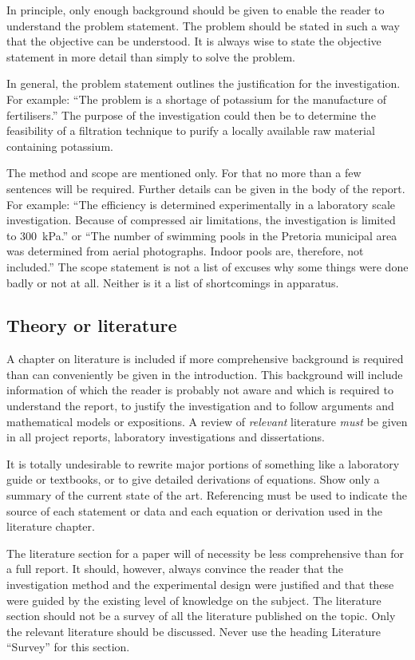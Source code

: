 \documentclass[a5paper, 10pt]{article}
\begin{document}
In principle, only enough background should be given to enable the
reader to understand the problem statement.  The problem should be
stated in such a way that the objective can be understood.
It is always wise to state the objective statement in more detail than simply to solve the problem.

In general, the problem statement outlines the justification for the
investigation.  For example: 
``The problem is a shortage of potassium for the manufacture of fertilisers.'' 
The purpose of the investigation could then be to determine the feasibility of a filtration technique to purify a locally available raw material containing potassium.

The method and scope are mentioned only.  For that no
more than a few sentences will be required.  Further details can be
given in the body of the report.  For example: ``The efficiency is
determined experimentally in a laboratory scale investigation.
Because of compressed air limitations, the investigation is limited to
\SI{300}{\kilo\pascal}.''  or ``The number of swimming pools in the Pretoria
municipal area was determined from aerial photographs.  Indoor pools
are, therefore, not included.''  The scope statement is not a
list of excuses why some things were done badly or not at all. Neither is it a list of shortcomings in apparatus.

\subsection{Theory or literature}
\label{sec:literature}
A chapter on literature is included if more comprehensive background
is required than can conveniently be given in the introduction.  This
background will include information of which the reader is probably
not aware and which is required to understand the report, to justify
the investigation and to follow arguments and mathematical models or
expositions.  A review of \emph{relevant} literature \emph{must} be
given in all project reports, laboratory investigations and
dissertations.

It is totally undesirable to rewrite major portions of something like a
laboratory guide or textbooks, or to give detailed derivations of
equations.  Show only a summary of the current state of the art.
Referencing must be used to indicate the source of each statement or
data and each equation or derivation used in the literature chapter.

The literature section for a paper will of necessity be less
comprehensive than for a full report.  It should, however, always
convince the reader that the investigation method and the experimental
design were justified and that these were guided by the existing level
of knowledge on the subject.  The literature section should
not be a survey of all the literature published on the topic.  Only
the relevant literature should be discussed.  Never use the heading
Literature ``Survey'' for this section.
\end{document}
